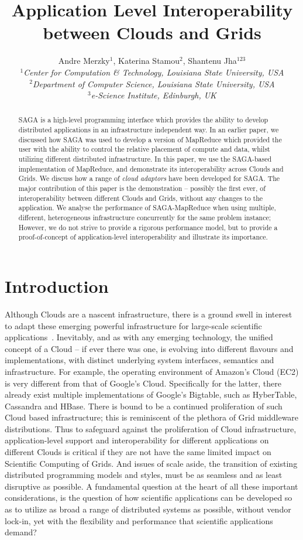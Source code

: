 \documentclass[conference,final]{IEEEtran}
\title{Application Level Interoperability between Clouds and Grids}
\author{Andre Merzky$^{1}$,  Katerina Stamou$^{2}$, Shantenu Jha$^{123}$\\
  \small{\emph{$^{1}$Center for Computation \& Technology, Louisiana
      State University, USA}}\\
  \small{\emph{$^{2}$Department of Computer Science, Louisiana State
      University, USA}}\\
  \small{\emph{$^{3}$e-Science Institute, Edinburgh, UK}}\\
}
\newcommand{\sagamapreduce }{SAGA-MapReduce }
\begin{document}
\maketitle

\begin{abstract}
  SAGA is a high-level programming interface which provides the
  ability to develop distributed applications in an infrastructure
  independent way. In an earlier paper, we discussed how SAGA was used
  to develop a version of MapReduce which provided the user with the
  ability to control the relative placement of compute and data,
  whilst utilizing different distributed infrastructure. In this
  paper, we use the SAGA-based implementation of MapReduce, and
  demonstrate its interoperability across Clouds and Grids.  We
  discuss how a range of {\it cloud adaptors} have been developed for
  SAGA.  The major contribution of this paper is the demonstration --
  possibly the first ever, of interoperability between different
  Clouds and Grids, without any changes to the application. We analyse
  the performance of \sagamapreduce when using multiple, different,
  heterogeneous infrastructure concurrently for the same problem
  instance; However, we do not strive to provide a rigorous
  performance model, but to provide a proof-of-concept of
  application-level interoperability and illustrate its importance.
\end{abstract}

\section{Introduction} 
Although Clouds are a nascent infrastructure, there is a ground swell
in interest to adapt these emerging powerful infrastructure for
large-scale scientific applications~\cite{montagecloud}. Inevitably,
and as with any emerging technology, the unified concept of a Cloud --
if ever there was one, is evolving into different flavours and
implementations, with distinct underlying system interfaces, semantics
and infrastructure. For example, the operating environment of Amazon's
Cloud (EC2) is very different from that of Google's
Cloud. Specifically for the latter, there already exist multiple
implementations of Google's Bigtable, such as HyberTable, Cassandra
and HBase. There is bound to be a continued proliferation of such
Cloud based infrastructure; this is reminiscent of the plethora of
Grid middleware distributions. Thus to safeguard against the
proliferation of Cloud infrastructure, application-level support and
interoperability for different applications on different Clouds is
critical if they are not have the same limited impact on Scientific
Computing of Grids. And issues of scale aside, the transition of
existing distributed programming models and styles, must be as
seamless and as least disruptive as possible.  A fundamental question
at the heart of all these important considerations, is the question of
how scientific applications can be developed so as to utilize as broad
a range of distributed systems as possible, without vendor lock-in,
yet with the flexibility and performance that scientific applications
demand?
\end{document}
